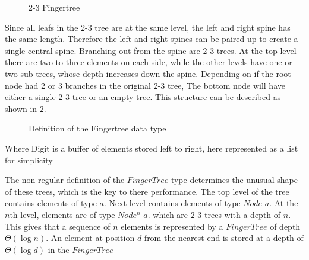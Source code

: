 \begin{figure}[!h]
\centering
{} 
\caption{2-3 Fingertree
\label{fig:fingertree}}
\end{figure}

Since all leafs in the 2-3 tree are at the same level, the left and right
spine has the same length. Therefore the left and right spines can be paired up
to create a single central spine. Branching out from the spine are 2-3 trees. At
the top level there are two to three elements on each side, while the other
levels have one or two sub-trees, whose depth increases down the spine.
Depending on if the root node had 2 or 3 branches in the original 2-3 tree, The
bottom node will have either a single 2-3 tree or an empty tree. This structure
can be described as shown in \cref{fig:DataTypeFingertree}.

\begin{figure}[h!]

\caption{Definition of the Fingertree data type \label{fig:DataTypeFingertree}}
\end{figure}

Where Digit is a buffer of elements stored left to right, here represented as a
list for simplicity

The non-regular definition of the $FingerTree$ type determines the unusual shape
of these trees, which is the key to there performance. The top level of the tree
contains elements of type $a$. Next level contains elements of type $Node$ $a$.
At the $n$th level, elements are of type $Node^n$ $a$. which are 2-3 trees with
a depth of $n$. This gives that a sequence of $n$ elements is represented by
a $FingerTree$ of depth $\Theta(\log n)$. An element at position $d$ from
the nearest end is stored at a depth of $\Theta(\log d)$ in the $FingerTree$

